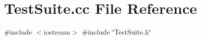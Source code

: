 \section{Test\+Suite.\+cc File Reference}
\label{TestSuite_8cc}
{\ttfamily \#include $<$iostream$>$}\newline
{\ttfamily \#include \char`\"{}Test\+Suite.\+h\char`\"{}}\newline
